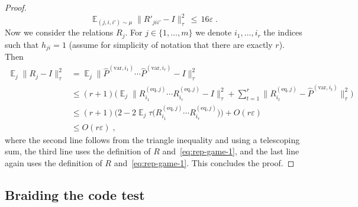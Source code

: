 \documentclass[11pt]{article}
\theoremstyle{definition}
\newcommand{\Id}{\ensuremath{I}}
\DeclareMathOperator*{\Expectation}{\mathbb{E}}
\newcommand{\Es}[1]{\Expectation_{#1}}
\newcommand{\eps}{\varepsilon}
\newcommand{\eq}{\mathrm{eq}}
\newcommand{\var}{\mathrm{var}}
\begin{document}
\begin{proof}
\[ \Es{(j,i,i')\sim\mu} \|R'_{jii'}-\Id\|_\tau^2 \,\leq\, 16\eps\;.\]
Now we consider the relations $R_j$. For $j\in\{1,\ldots,m\}$ we denote $i_1,\ldots,i_r$ the indices such that $h_{ji}=1$ (assume for simplicity of notation that there are exactly $r$). Then 
\begin{align*}
\Es{j} \|R_{j}-\Id\|_\tau^2
 &= \Es{j} \big\| \widehat{P}^{(\var,i_1)}\cdots \widehat{P}^{(\var,i_r)}-\Id\big\|_\tau^2\\
&\leq (r+1)\Big(\Es{j} \big\| R^{(\eq,j)}_{i_1}\cdots R^{(\eq,j)}_{i_r}-\Id\big\|_\tau^2 + \sum_{t=1}^r \big\|R^{(\eq,j)}_{i_t}-\widehat{P}^{(\var,i_t)}\big\|_\tau^2\Big)\\
&\leq (r+1)\big(2-2\Es{j}\tau\big( R^{(\eq,j)}_{i_1}\cdots R^{(\eq,j)}_{i_r}\big)\big) + O(r\eps)\\
&\leq O(r\eps)\;,
\end{align*}
where the second line follows from the triangle inequality and using a telescoping sum, the third line uses the definition of $R$ and~\eqref{eq:rep-game-1}, and the last line again uses the definition of $R$ and~\eqref{eq:rep-game-1}. This concludes the proof. 
\end{proof}





\subsection{Braiding the code test}
\label{sec:braiding}
\end{document}
